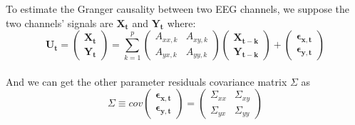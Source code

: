 \documentclass[conference]{IEEEtran}
\begin{document}
To estimate the Granger causality between two EEG channels, we suppose the two channels' signals are $\mathbf{X_t}$ and $\mathbf{Y_t}$ where:
\begin{equation}
\mathbf{U_t} =  \begin{pmatrix}
                  \mathbf{X_t}\\
                  \mathbf{Y_t}
                \end{pmatrix} = \sum_{k=1}^{p} \begin{pmatrix}
                                                  A_{xx,k} & A_{xy,k}\\
                                                  A_{yx,k} & A_{yy,k}
                                                \end{pmatrix} \begin{pmatrix}
                                                              \mathbf{X_{t-k}}\\
                                                              \mathbf{Y_{t-k}}
                                                                    \end{pmatrix} + \begin{pmatrix}
                                                                                      \mathbf{\epsilon_{x,t}}\\
                                                                                      \mathbf{\epsilon_{y,t}}
                                                                                    \end{pmatrix}
\end{equation}
\\
And we can get the other parameter residuals covariance matrix $\Sigma$ as
\begin{equation}
\Sigma \equiv cov \begin{pmatrix}
                   \mathbf{\epsilon_{x,t}}\\                                                                             \mathbf{\epsilon_{y,t}}
                  \end{pmatrix} = \begin{pmatrix}
                                   \Sigma_{xx} & \Sigma_{xy}\\                                                                           \Sigma_{yx} & \Sigma_{yy}
                                  \end{pmatrix}
\end{equation}
\end{document}
